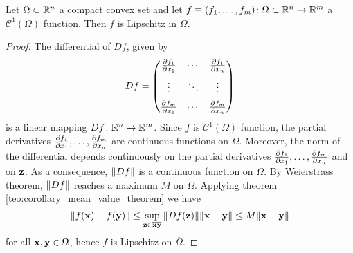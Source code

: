 \begin{theorem}
	Let $\Omega \subset \mathbb{R}^n$ a compact convex set and let $f \equiv (f_1, \ldots, f_m) \colon \Omega \subset \mathbb{R}^n \to \mathbb{R}^m$ a $\mathcal{C}^1(\Omega)$ function. Then $f$ is Lipschitz in $\Omega$.
\end{theorem}
\begin{proof}
	The differential of $D f$, given by
	\begin{equation}
		D f = 
		\begin{pmatrix}
			\pdv{f_1}{x_1} & \cdots & \pdv{f_1}{x_n} \\[6pt]
			\vdots & \ddots & \vdots \\[6pt]
			\pdv{f_m}{x_1} & \cdots & \pdv{f_m}{x_n} \\
		\end{pmatrix}
	\end{equation}
	is a linear mapping $D f \colon \mathbb{R}^n \rightarrow \mathbb{R}^m$. Since $f$ is $\mathcal{C}^1(\Omega)$ function, the partial derivatives $\pdv{f_1}{x_1}, \ldots, \pdv{f_m}{x_n}$ are continuous functions on $\Omega$. Moreover, the norm of the differential depends continuously on the partial derivatives $\pdv{f_1}{x_1}, \ldots, \pdv{f_m}{x_n}$ and on $\vb{z}$. As a consequence, $\norm{D f}$ is a continuous function on $\Omega$. By Weierstrass theorem, $\norm{D f}$ reaches a maximum $M$ on $\Omega$. Applying theorem \ref{teo:corollary_mean_value_theorem} we have 
	\begin{equation}
		\norm{f(\vb{x}) - f(\vb{y})} \leq \sup_{\vb{z} \in 
		\overline{\vb{x}\vb{y}}} \norm{D f(\vb{z})} \norm{\vb{x} - \vb{y}} \leq
		M \norm{\vb{x} - \vb{y}}
	\end{equation}
	for all $\vb{x}, \vb{y} \in \Omega$, hence $f$ is Lipschitz on $\overline{\Omega}$.
\end{proof}

%
%

